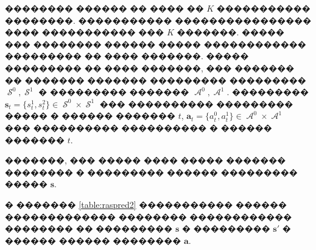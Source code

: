 \documentclass[11pt]{ubs}
\DeclareMathOperator{\state}{\mathcal{S}}
\DeclareMathOperator{\action}{\mathcal{A}}
\begin{document}
��������  ������  �� ���� �� $K$ ����������� ��������. ����������� ���������������� ����   ����������� ��� $K$ �������. ����� ��� �������� ������ ����� ������������ ��������� �� ���� �������.   
����� ��������� �� ���� �������, ��� ������� �� ������� ������� ��������� ��������� $ \state^0, \state^1$ � ��������� ������� $\action^0, \action^1$. 
��������� $\textbf{s}_t = \{s_t^1, s_t^2\} \in \state^0\times \state^1$ ���  ���������� ��������� ����� � ������ ������� $t$,    $\textbf{a}_t = \{a_t^0, a_t^1\} \in \action^0\times \action^1$ ��� ���������� ���������� � ������ ������� $t$.

�������, ��� ����� ���� ����� ������� �������� � ��������� ������ ��������� ����� $\textbf{s}$.
\begin{example}
  � ������� \ref{table:raspred2} ����������� ������ ������������� �������� ������������ �������� �� ��������� $\textbf{s}$ � ��������� $\textbf{s}'$ � ������ ������ �������� $\textbf{a}$.
 

\end{example}
\end{document}
